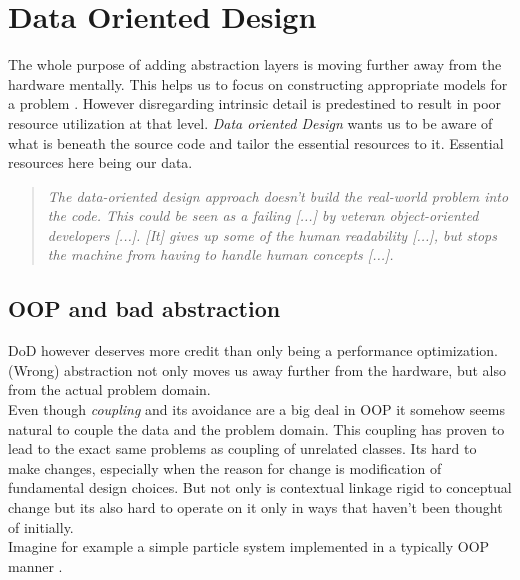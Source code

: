 \section{Data Oriented Design}\label{dod}
The whole purpose of adding abstraction layers is moving further away from the hardware mentally. This helps us to focus on constructing appropriate models for a problem . However disregarding intrinsic detail is predestined to result in poor resource utilization at that level. \textit{Data oriented Design} wants us to be aware of what is beneath the source code and tailor the essential resources to it. Essential resources here being our data. 
\begin{quote}
	\textit{The data-oriented design approach doesn't build the real-world problem into the code. This could be seen as a failing [...] by veteran object-oriented developers [...]. [It] gives up some of the human readability [...], but stops the machine from having to handle human concepts [...].} 
\end{quote}
\subsection{OOP and bad abstraction}\label{oop_bad_abstraction}
DoD however deserves more credit than only being a performance optimization. (Wrong) abstraction not only moves us away further from the hardware, but also from the actual problem domain.\\
Even though \textit{coupling} and its avoidance are a big deal in OOP it somehow seems natural to couple the data and the problem domain. This coupling has proven to lead to the exact same problems as coupling of unrelated classes. Its hard to make changes, especially when the reason for change is modification of fundamental design choices. But not only is contextual linkage rigid to conceptual change but its also hard to operate on it only in ways that haven't been thought of initially.\\
Imagine for example a simple particle system implemented in a typically OOP manner .

